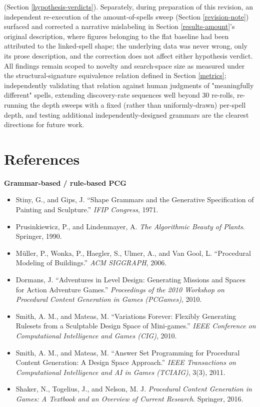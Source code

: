 \documentclass[]{article}
\begin{document}
(Section \ref{hypothesis-verdicts}). Separately, during preparation of this revision, an independent re-execution of the amount-of-spells sweep (Section \ref{revision-note}) surfaced and corrected a narrative mislabeling in Section \ref{results-amount}'s original description, where figures belonging to the flat baseline had been attributed to the linked-spell shape; the underlying data was never wrong, only its prose description, and the correction does not affect either hypothesis verdict. All findings remain scoped to novelty and search-space size as measured under the structural-signature equivalence relation defined in Section \ref{metrics}; independently validating that relation against human judgments of "meaningfully different" spells, extending discovery-rate sequences well beyond 30 re-rolls, re-running the depth sweeps with a fixed (rather than uniformly-drawn) per-spell depth, and testing additional independently-designed grammars are the clearest directions for future work.

        \section{References}\label{references}

        \textbf{Grammar-based / rule-based PCG}

        \begin{itemize}
            \item Stiny, G., and Gips, J. ``Shape Grammars and the Generative Specification of Painting and Sculpture.'' \textit{IFIP Congress}, 1971.
            \item Prusinkiewicz, P., and Lindenmayer, A. \textit{The Algorithmic Beauty of Plants}. Springer, 1990.
            \item Müller, P., Wonka, P., Haegler, S., Ulmer, A., and Van Gool, L. ``Procedural Modeling of Buildings.'' \textit{ACM SIGGRAPH}, 2006.
            \item Dormans, J. ``Adventures in Level Design: Generating Missions and Spaces for Action Adventure Games.'' \textit{Proceedings of the 2010 Workshop on Procedural Content Generation in Games (PCGames)}, 2010.
            \item Smith, A. M., and Mateas, M. ``Variations Forever: Flexibly Generating Rulesets from a Sculptable Design Space of Mini-games.'' \textit{IEEE Conference on Computational Intelligence and Games (CIG)}, 2010.
            \item Smith, A. M., and Mateas, M. ``Answer Set Programming for Procedural Content Generation: A Design Space Approach.'' \textit{IEEE Transactions on Computational Intelligence and AI in Games (TCIAIG)}, 3(3), 2011.
            \item Shaker, N., Togelius, J., and Nelson, M. J. \textit{Procedural Content Generation in Games: A Textbook and an Overview of Current Research}. Springer, 2016.
        \end{itemize}
\end{document}
